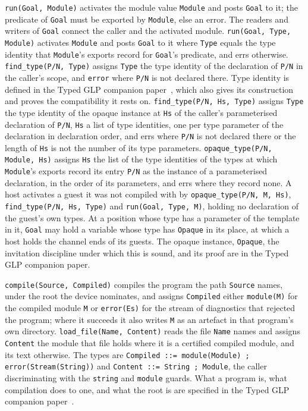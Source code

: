 \verb|run(Goal, Module)| activates the module value \verb|Module| and posts \verb|Goal| to it; the predicate of \verb|Goal| must be exported by \verb|Module|, else an error. The readers and writers of \verb|Goal| connect the caller and the activated module. \verb|run(Goal, Type, Module)| activates \verb|Module| and posts \verb|Goal| to it where \verb|Type| equals the type identity that \verb|Module|'s exports record for \verb|Goal|'s predicate, and errs otherwise. \verb|find_type(P/N, Type)| assigns \verb|Type| the type identity of the declaration of \verb|P/N| in the caller's scope, and \verb|error| where \verb|P/N| is not declared there. Type identity is defined in the Typed GLP companion paper~\cite{shapiro2026types}, which also gives its construction and proves the compatibility it rests on.  \verb|find_type(P/N, Hs, Type)| assigns \verb|Type| the type identity of the opaque instance at \verb|Hs| of the caller's parameterised declaration of \verb|P/N|, \verb|Hs| a list of type identities, one per type parameter of the declaration in declaration order, and errs where \verb|P/N| is not declared there or the length of \verb|Hs| is not the number of its type parameters.  \verb|opaque_type(P/N, Module, Hs)| assigns \verb|Hs| the list of the type identities of the types at which \verb|Module|'s exports record its entry \verb|P/N| as the instance of a parameterised declaration, in the order of its parameters, and errs where they record none.  A host activates a guest it was not compiled with by \verb|opaque_type(P/N, M, Hs)|, \verb|find_type(P/N, Hs, Type)| and \verb|run(Goal, Type, M)|, holding no declaration of the guest's own types.  At a position whose type has a parameter of the template in it, \verb|Goal| may hold a variable whose type has \verb|Opaque| in its place, at which a host holds the channel ends of its guests.  The opaque instance, \verb|Opaque|, the invitation discipline under which this is sound, and its proof are in the Typed GLP companion paper.

\verb|compile(Source, Compiled)| compiles the program the path \verb|Source| names, under the root the device nominates, and assigns \verb|Compiled| either \verb|module(M)| for the compiled module \verb|M| or \verb|error(Es)| for the stream of diagnostics that rejected the program; where it succeeds it also writes \verb|M| as an artefact in that program's own directory. \verb|load_file(Name, Content)| reads the file \verb|Name| names and assigns \verb|Content| the module that file holds where it is a certified compiled module, and its text otherwise. The types are \verb|Compiled ::= module(Module) ; error(Stream(String))| and \verb|Content ::= String ; Module|, the caller discriminating with the \verb|string| and \verb|module| guards. What a program is, what compilation does to one, and what the root is are specified in the Typed GLP companion paper~\cite{shapiro2026types}.

